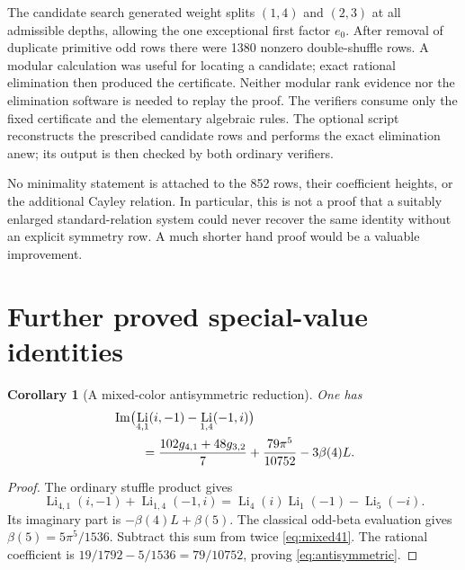 \documentclass[11pt,letterpaper]{article}
\numberwithin{equation}{section}
\newtheorem{corollary}[theorem]{Corollary}
\theoremstyle{definition}
\DeclareMathOperator{\Li}{Li}
\DeclareMathOperator{\Imag}{Im}
\begin{document}
The candidate search generated weight splits $(1,4)$ and $(2,3)$ at all
admissible depths, allowing the one exceptional first factor $e_0$.
After removal of duplicate primitive odd rows there were 1380
nonzero double-shuffle rows. A modular calculation was useful for
locating a candidate; exact rational elimination then produced the
certificate. Neither modular rank evidence nor the elimination software
is needed to replay the proof. The verifiers consume only the fixed
certificate and the elementary algebraic rules. The optional script
 reconstructs the prescribed candidate rows
and performs the exact elimination anew; its output is then checked by
both ordinary verifiers.

No minimality statement is attached to the 852 rows, their coefficient
heights, or the additional Cayley relation. In particular, this is not a
proof that a suitably enlarged standard-relation system could never
recover the same identity without an explicit symmetry row. A much
shorter hand proof would be a valuable improvement.

\section{Further proved special-value identities}
\label{sec:consequences}

\begin{corollary}[A mixed-color antisymmetric reduction]\label{cor:antisym}
One has
\begin{align}
 &\Imag\bigl(\Li_{4,1}(i,-1)-\Li_{1,4}(-1,i)\bigr)\notag\\
 &\hspace{8mm}=\frac{102g_{4,1}+48g_{3,2}}7
       +\frac{79\pi^5}{10752}-3\beta(4)L.
 \label{eq:antisymmetric}
\end{align}
\end{corollary}
\begin{proof}
The ordinary stuffle product gives
\[
 \Li_{4,1}(i,-1)+\Li_{1,4}(-1,i)
  =\Li_4(i)\Li_1(-1)-\Li_5(-i).
\]
Its imaginary part is $-\beta(4)L+\beta(5)$. The classical odd-beta
evaluation gives $\beta(5)=5\pi^5/1536$. Subtract this sum from twice
\eqref{eq:mixed41}. The rational coefficient is
$19/1792-5/1536=79/10752$, proving \eqref{eq:antisymmetric}.
\end{proof}
\end{document}
